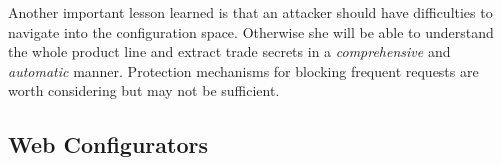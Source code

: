 \documentclass{sig-alternate}
\newcommand\ma[1]{\todo[color=green!40,inline]{TODO (Mathieu): #1}}
\newcommand\ma[1]{}
\begin{document}
Another important lesson learned is that an attacker should have difficulties to navigate into the configuration space. Otherwise she will be able to understand the whole product line and extract trade secrets in a \emph{comprehensive} and \emph{automatic} manner. Protection mechanisms for blocking frequent requests are worth considering but may not be sufficient. 

 




% 

\subsection{Web Configurators}
\label{sec:casestudy4}





% 

% 

% 
\end{document}
